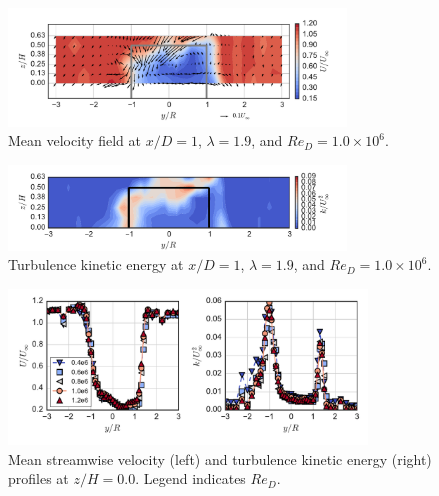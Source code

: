 \documentclass[energies,article,accept,moreauthors,pdftex,12pt,a4paper]{mdpi}
\begin{document}
\begin{figure}[ht!]
    \centering
    
    \includegraphics[width=0.8\textwidth]{figures/meancontquiv_10}
    
    \caption{Mean velocity field at $x/D=1$, $\lambda=1.9$, and $Re_D=1.0 \times
        10^6$.}
    
    \label{fig:meancontquiv}
\end{figure}

\begin{figure}[ht!]
    \centering
    
    \includegraphics[width=0.8\textwidth]{figures/k_contours_10}
    
    \caption{Turbulence kinetic energy at $x/D=1$, $\lambda=1.9$, and $Re_D=1.0
        \times 10^6$.}
    
    \label{fig:kcont}
\end{figure}

\begin{figure}[ht!]
    \centering
    
    \includegraphics[width=0.85\textwidth]{figures/mean_u_k_profiles}
    
    \caption{Mean streamwise velocity (left) and turbulence kinetic energy
        (right) profiles at $z/H=0.0$. Legend indicates $Re_D$.}
    
    \label{fig:profiles}
\end{figure}
\end{document}
